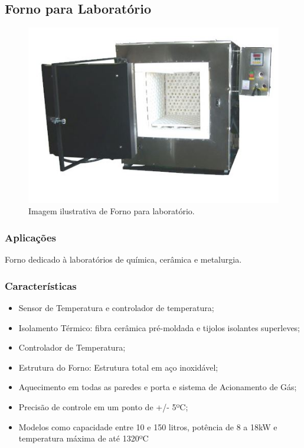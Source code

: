 \subsection{Forno para Laboratório}

\begin{figure}[!h]
	\centering
	\label{forno_laboratorio}
	\includegraphics[keepaspectratio=true,scale=0.8]{figuras/forno_laboratorio.JPG}
	\caption{Imagem ilustrativa de Forno para laboratório.}
\end{figure}

\subsubsection{Aplicações}

Forno dedicado à laboratórios de química, cerâmica e metalurgia.

\subsubsection{Características}

\begin{itemize}
	\item Sensor de Temperatura e controlador de temperatura;
	\item Isolamento Térmico: fibra cerâmica pré-moldada e tijolos isolantes superleves;
	\item Controlador de Temperatura;
	\item Estrutura do Forno: Estrutura total em aço inoxidável;
	\item Aquecimento em todas as paredes e porta e sistema de Acionamento de Gás;
	\item Precisão de controle em um ponto de +/- 5ºC; 
	\item Modelos como capacidade entre 10 e 150 litros, potência de 8 a 18kW e temperatura máxima de até 1320ºC
\end{itemize}


